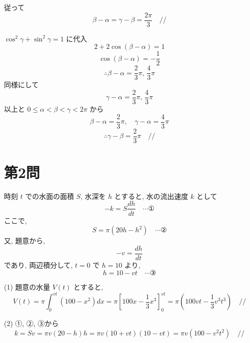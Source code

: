 \documentclass[../main.tex]{subfiles}
\begin{document}
従って
\[
  \beta - \alpha = \gamma - \beta = \frac{2\pi}{3} \quad /\!/
\]

\bigskip
\noindent
[\textbf{解2}]
$\cos^2\gamma + \sin^2\gamma = 1$ に代入
\[
  2 + 2\cos(\beta - \alpha) = 1
\]
\[
  \cos(\beta - \alpha) = -\frac{1}{2}
\]
\[
  \therefore \beta - \alpha = \frac{2}{3}\pi, \, \frac{4}{3}\pi
\]
同様にして
\[
  \gamma - \alpha = \frac{2}{3}\pi, \, \frac{4}{3}\pi
\]
以上と $0 \le \alpha < \beta < \gamma < 2\pi$ から
\[
  \beta - \alpha = \frac{2}{3}\pi, \quad \gamma - \alpha = \frac{4}{3}\pi
\]
\[
  \therefore \gamma - \beta = \frac{2}{3}\pi \quad /\!/
\]

\newpage

\section*{第2問}

\begin{center}
\end{center}

\noindent
[\textbf{解}] 時刻 $t$ での水面の面積 $S$, 水深を $h$ とすると, 水の流出速度 $k$ として
\begin{equation}
  -k = S \frac{dh}{dt} \quad \cdots \text{①}
\end{equation}
ここで,
\begin{equation}
  S = \pi (20h - h^2) \quad \cdots \text{②}
\end{equation}
又, 題意から,
\[
  -v = \frac{dh}{dt}
\]
であり, 両辺積分して, $t=0$ で $h=10$ より,
\begin{equation}
  h = 10 - vt \quad \cdots \text{③}
\end{equation}

\noindent
(1) 題意の水量 $V(t)$ とすると,
\[
  V(t) = \pi \int_0^{vt} (100 - x^2) dx = \pi \left[ 100x - \frac{1}{3}x^3 \right]_0^{vt} = \pi \left( 100vt - \frac{1}{3}v^3 t^3 \right) \quad /\!/
\]

\noindent
(2) ①, ②, ③から
\[
  k = S v = \pi v (20-h) h = \pi v (10+vt)(10-vt) = \pi v (100 - v^2 t^2) \quad /\!/
\]
\end{document}
